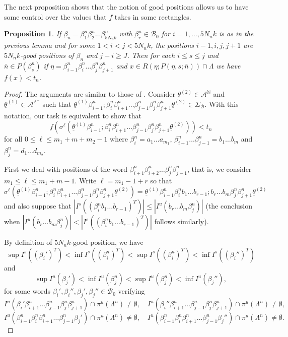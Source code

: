 \documentclass[12pt]{amsart}
\theoremstyle{plain} %
\newtheorem{proposition}[theorem]{Proposition}
\theoremstyle{definition} %
\numberwithin{equation}{section}
\begin{document}
The next proposition shows that the notion of good positions allows us to have some control over the values that $f$ takes in some rectangles. 

\begin{proposition}\label{control}
If $\beta_n=\beta^n_1\beta^n_2\dots\beta^n_{5N_nk}$ with $\beta^n_r\in \mathcal{B}_0$ for $i=1, \dots, 5N_nk$ is as in the previous lemma and for some $1<i<j<5N_nk$, the positions $i-1,i,j,j+1$ are $5N_nk$-good positions of $\beta_n$ and $j-i \geq J$. Then for each $i\leq s \leq j$ and $\bar{n} \in P(\beta^n_s)$ if $\eta=\beta^n_{i-1}\beta^n_{i}\dots\beta^n_j\beta^n_{j+1}$ and $x\in R(\eta;P(\eta,s;\bar{n}))\cap \Lambda$ we have $f(x)<t_n$.
\end{proposition}

\begin{proof}
The arguments are similar to those of \cite[Proposition 2.9]{CMM16}. Consider $\underline{\theta}^{(2)}\in\mathcal{A}^{\mathbb{N}}$ and $\underline{\theta}^{(1)}\in\mathcal{A}^{\mathbb{Z}^-}$ such that $\underline{\theta}^{(1)}\beta^n_{i-1};\beta^n_i\beta^n_{i+1}\dots\beta^n_{j-1}\beta^n_j\beta^n_{j+1}\underline{\theta}^{(2)}\in \Sigma_{\mathcal{B}}$. With this notation, our task is equivalent to show that
\begin{equation}\label{e.decreasing-f}f(\sigma^{\ell}(\underline{\theta}^{(1)}\beta^n_{i-1};\beta^n_i\beta^n_{i+1}\dots\beta^n_{j-1}\beta^n_j\beta^n_{j+1}\underline{\theta}^{(2)}))< t_n
\end{equation}
for all $0\leq \ell\leq m_1+m+m_2-1$ where $\beta^n_i=a_1\dots a_{m_1}$, $\beta^n_{i+1}\dots\beta^n_{j-1}=b_{1}\dots b_{m}$ and $\beta^n_j=d_{1}\dots d_{m_2}$.

First we deal with positions of the word $\beta^n_{i+1}\beta^n_{i+2}\dots\beta^n_j\beta^n_{j-1}$, that is, we consider $m_1\leq \ell\leq m_1+m-1.$ Write $\ell=m_1-1+r$ so that
\begin{equation}\label{e.sigma-l-B}\sigma^{\ell}(\underline{\theta}^{(1)}\beta^n_{i-1};\beta^n_i\beta^n_{i+1}\dots\beta^n_{j-1}\beta^n_j\beta^n_{j+1}\underline{\theta}^{(2)}) = \underline{\theta}^{(1)}\beta^n_{i-1}\beta^n_i b_1\dots b_{r-1}; b_r\dots b_{m}\beta^n_j\beta^n_{j+1}\underline{\theta}^{(2)}
\end{equation}
and also suppose that $|I^s((\beta^n_i b_1\dots b_{r-1})^T)|\leq |I^u(b_r\dots b_{m}\beta^n_j)|$ (the conclusion when $|I^u(b_r\dots b_{m}\beta^n_j)|<|I^s((\beta^n_i b_1\dots b_{r-1})^T)|$ follows similarly).

By definition of $5N_nk$-good position, we have 
$$\sup I^s((\beta_i')^T)<\inf I^s((\beta^n_i)^T)< \sup I^s((\beta^n_i)^T)<\inf I^s((\beta_i'')^T)$$
and
$$\sup I^u(\beta_j ')<\inf I^u(\beta^n_j)< \sup I^u(\beta^n_j)<\inf I^u(\beta_j ''),$$
for some words $\beta_i',\beta_i'',\beta_j',\beta_j''\in\mathcal{B}_0$ verifying 
$$I^u(\beta_i'\beta^n_{i+1}\dots\beta^n_{j-1}\beta^n_j\beta^n_{j+1})\cap \pi^u(\Lambda^n)\neq\emptyset, \quad I^u(\beta_i''\beta^n_{i+1}\dots\beta^n_{j-1}\beta^n_j\beta^n_{j+1})\cap \pi^u(\Lambda^n)\neq\emptyset,$$ 
$$I^u(\beta^n_{i-1}\beta^n_i\beta^n_{i+1}\dots\beta^n_{j-1}\beta_j')\cap \pi^u(\Lambda^n)\neq\emptyset, \quad I^u(\beta^n_{i-1}\beta^n_i\beta^n_{i+1}\dots\beta^n_{j-1}\beta_j'')\cap \pi^u(\Lambda^n)\neq\emptyset.$$


\end{proof}
\end{document}
